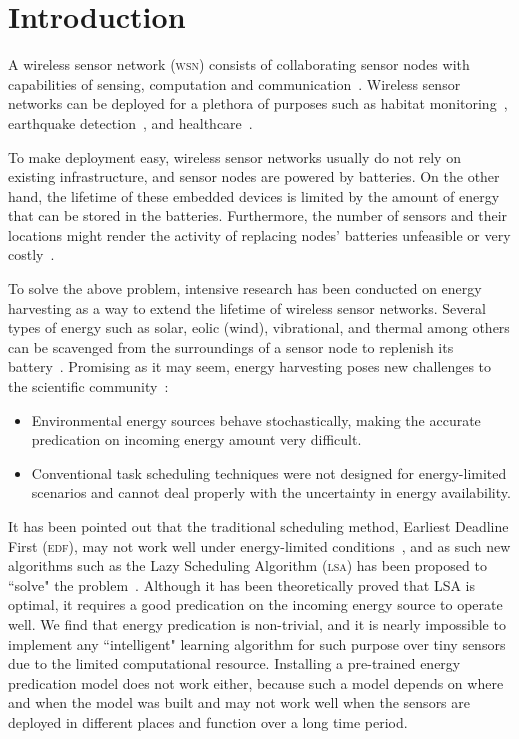 \section{Introduction}\label{sec:introduction}

A wireless sensor network (\textsc{wsn}) consists of collaborating sensor nodes with capabilities of sensing, computation and communication~\cite{sudevalyam2010energy}. Wireless sensor networks can be deployed for a plethora of purposes such as habitat monitoring~\cite{mainwaring2002wireless}, earthquake detection~\cite{suzuki2007earthquake}, and healthcare~\cite{saadaoui2007architecture}. 

To make deployment easy, wireless sensor networks usually do not rely on existing infrastructure, and sensor nodes are powered by batteries. On the other hand, the lifetime of these embedded devices is limited by the amount of energy that can be stored in the batteries. Furthermore, the number of sensors and their locations might render the activity of replacing nodes' batteries unfeasible or very costly~\cite{moser2007real}. 

To solve the above problem, intensive research has been conducted on energy harvesting as a way to extend the lifetime of wireless sensor networks. Several types of energy such as solar, eolic (wind), vibrational, and thermal among others can be scavenged from the surroundings of a sensor node to replenish its battery~\cite{roundy2004power}. Promising as it may seem, energy harvesting poses new challenges to the scientific community~\cite{lu2010accurate}:

\begin{itemize}
	\item Environmental energy sources behave stochastically, making the accurate predication on incoming energy amount very difficult.
	\item Conventional task scheduling techniques were not designed for energy-limited scenarios and cannot deal properly with the uncertainty in energy availability.
\end{itemize}

It has been pointed out that the traditional scheduling method, Earliest Deadline First (\textsc{edf}), may not work well under energy-limited conditions~\cite{moser2007real}, and as such new algorithms such as the Lazy Scheduling Algorithm (\textsc{lsa}) has been proposed to ``solve" the problem~\cite{moser2007real}. Although it has been theoretically proved that LSA is optimal, it requires a good predication on the incoming energy source to operate well. We find that energy predication is non-trivial, and it is nearly impossible to implement any ``intelligent" learning algorithm for such purpose over tiny sensors due to the limited computational resource. Installing a pre-trained energy predication model does not work either, because such a model depends on where and when the model was built and may not work well when the sensors are deployed in different places and function over a long time period. 

